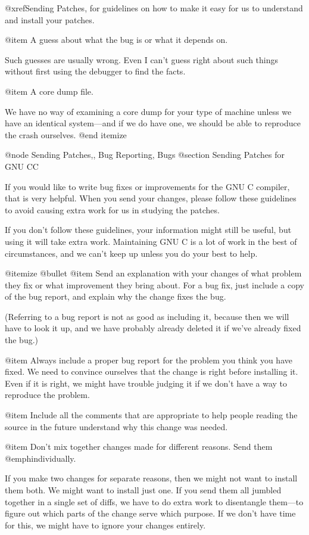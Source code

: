 @xref{Sending Patches}, for guidelines on how to make it easy for us to
understand and install your patches.

@item
A guess about what the bug is or what it depends on.

Such guesses are usually wrong.  Even I can't guess right about such
things without first using the debugger to find the facts.

@item
A core dump file.

We have no way of examining a core dump for your type of machine
unless we have an identical system---and if we do have one,
we should be able to reproduce the crash ourselves.
@end itemize

@node Sending Patches,, Bug Reporting, Bugs
@section Sending Patches for GNU CC

If you would like to write bug fixes or improvements for the GNU C
compiler, that is very helpful.  When you send your changes, please
follow these guidelines to avoid causing extra work for us in studying
the patches.

If you don't follow these guidelines, your information might still be
useful, but using it will take extra work.  Maintaining GNU C is a lot
of work in the best of circumstances, and we can't keep up unless you do
your best to help.

@itemize @bullet
@item
Send an explanation with your changes of what problem they fix or what
improvement they bring about.  For a bug fix, just include a copy of the
bug report, and explain why the change fixes the bug.

(Referring to a bug report is not as good as including it, because then
we will have to look it up, and we have probably already deleted it if
we've already fixed the bug.)

@item
Always include a proper bug report for the problem you think you have
fixed.  We need to convince ourselves that the change is right before
installing it.  Even if it is right, we might have trouble judging it if
we don't have a way to reproduce the problem.

@item
Include all the comments that are appropriate to help people reading the
source in the future understand why this change was needed.

@item
Don't mix together changes made for different reasons.
Send them @emph{individually}.

If you make two changes for separate reasons, then we might not want to
install them both.  We might want to install just one.  If you send them
all jumbled together in a single set of diffs, we have to do extra work
to disentangle them---to figure out which parts of the change serve
which purpose.  If we don't have time for this, we might have to ignore
your changes entirely.

